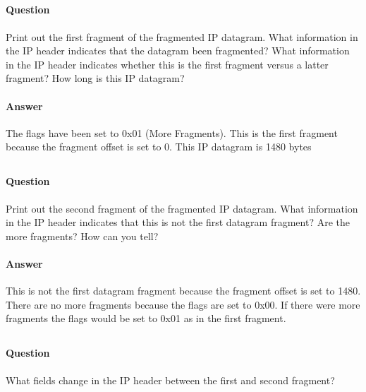 \documentclass[12pt,letterpaper]{article}
\begin{document}


\label{11}
\subsection{}
\paragraph{Question}
Print out the first fragment of the fragmented IP datagram. What information in
the IP header indicates that the datagram been fragmented? What information in
the IP header indicates whether this is the first fragment versus a latter fragment?
How long is this IP datagram?
\paragraph{Answer} The flags have been set to 0x01 (More Fragments). This is
the first fragment because the fragment offset is set to 0. This IP datagram
is 1480 bytes



\subsection{}
\paragraph{Question}
Print out the second fragment of the fragmented IP datagram. What information in
the IP header indicates that this is not the first datagram fragment? Are the more
fragments? How can you tell?
\paragraph{Answer} This is not the first datagram fragment because the fragment
offset is set to 1480. There are no more fragments because the flags are set to
0x00. If there were more fragments the flags would be set to 0x01 as in the
first fragment.



\label{13}
\subsection{}
\paragraph{Question}
What fields change in the IP header between the first and second fragment?
\end{document}
